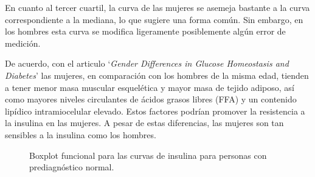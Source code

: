 En cuanto al tercer cuartil, la curva de las mujeres se asemeja bastante a la curva correspondiente a la mediana, lo que sugiere una forma común. Sin embargo, en los hombres esta curva se modifica ligeramente posiblemente algún error de medición. 

De acuerdo, con el articulo `\textit{Gender Differences in Glucose Homeostasis and Diabetes}' \cite{GenderDifferences2018} las mujeres, en comparación con los hombres de la misma edad, tienden a tener menor masa muscular esquelética y mayor masa de tejido adiposo, así como mayores niveles circulantes de ácidos grasos libres (FFA) y un contenido lipídico intramiocelular elevado. Estos factores podrían promover la resistencia a la insulina en las mujeres. A pesar de estas diferencias, las mujeres son tan sensibles a la insulina como los hombres.


\begin{figure}[H]
 \centering
    \caption{Boxplot funcional para las curvas de insulina para personas con prediagnóstico normal.}
    \label{fig:insulinaNormal}
\end{figure}



